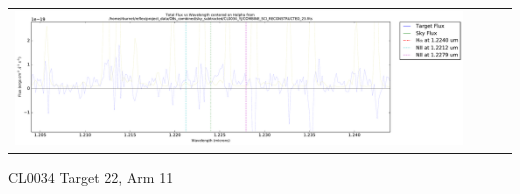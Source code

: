 \documentclass[10pt,letterpaper]{article}
\begin{document}
\begin{table}[h!]
\begin{center}
\begin{tabular}{ >{\centering\arraybackslash}m{2.5in} >{\centering\arraybackslash}m{2.5in} >{\centering\arraybackslash}m{2.5in} >{\centering\arraybackslash}m{2.3in}}
\includegraphics[scale=0.45]{../figures/CL0034_YJ/COMBINE_SCI_RECONSTRUCTED_23_Halpha.pdf}
\end{tabular}
\end{center}
\end{table}

\newpage

CL0034 Target 22, Arm 11 \\
\end{document}
